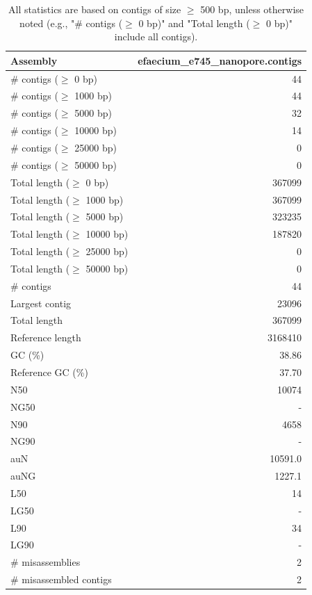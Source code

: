 \documentclass[12pt,a4paper]{article}
\begin{document}
\begin{table}[ht]
\begin{center}
\caption{All statistics are based on contigs of size $\geq$ 500 bp, unless otherwise noted (e.g., "\# contigs ($\geq$ 0 bp)" and "Total length ($\geq$ 0 bp)" include all contigs).}
\begin{tabular}{|l*{1}{|r}|}
\hline
Assembly & efaecium\_e745\_nanopore.contigs \\ \hline
\# contigs ($\geq$ 0 bp) & 44 \\ \hline
\# contigs ($\geq$ 1000 bp) & 44 \\ \hline
\# contigs ($\geq$ 5000 bp) & 32 \\ \hline
\# contigs ($\geq$ 10000 bp) & 14 \\ \hline
\# contigs ($\geq$ 25000 bp) & 0 \\ \hline
\# contigs ($\geq$ 50000 bp) & 0 \\ \hline
Total length ($\geq$ 0 bp) & 367099 \\ \hline
Total length ($\geq$ 1000 bp) & 367099 \\ \hline
Total length ($\geq$ 5000 bp) & 323235 \\ \hline
Total length ($\geq$ 10000 bp) & 187820 \\ \hline
Total length ($\geq$ 25000 bp) & 0 \\ \hline
Total length ($\geq$ 50000 bp) & 0 \\ \hline
\# contigs & 44 \\ \hline
Largest contig & 23096 \\ \hline
Total length & 367099 \\ \hline
Reference length & 3168410 \\ \hline
GC (\%) & 38.86 \\ \hline
Reference GC (\%) & 37.70 \\ \hline
N50 & 10074 \\ \hline
NG50 & - \\ \hline
N90 & 4658 \\ \hline
NG90 & - \\ \hline
auN & 10591.0 \\ \hline
auNG & 1227.1 \\ \hline
L50 & 14 \\ \hline
LG50 & - \\ \hline
L90 & 34 \\ \hline
LG90 & - \\ \hline
\# misassemblies & 2 \\ \hline
\# misassembled contigs & 2 \\ \hline

\end{tabular}
\end{center}
\end{table}
\end{document}
